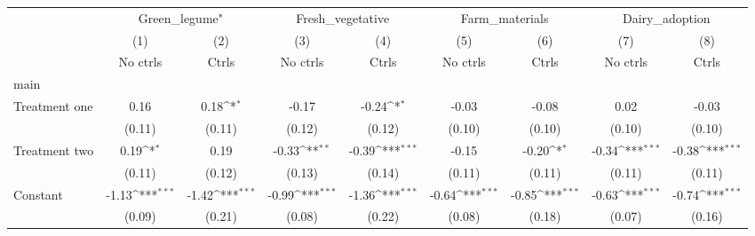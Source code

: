 {
\def\sym#1{\ifmmode^{#1}\else\(^{#1}\)\fi}
\begin{tabular}{l*{8}{c}}
\hline\hline
                    &\multicolumn{2}{c}{Green\_legume"}          &\multicolumn{2}{c}{Fresh\_vegetative}       &\multicolumn{2}{c}{Farm\_materials}         &\multicolumn{2}{c}{Dairy\_adoption}         \\
                    &\multicolumn{1}{c}{(1)}&\multicolumn{1}{c}{(2)}&\multicolumn{1}{c}{(3)}&\multicolumn{1}{c}{(4)}&\multicolumn{1}{c}{(5)}&\multicolumn{1}{c}{(6)}&\multicolumn{1}{c}{(7)}&\multicolumn{1}{c}{(8)}\\
                    &\multicolumn{1}{c}{No ctrls}&\multicolumn{1}{c}{Ctrls}&\multicolumn{1}{c}{No ctrls}&\multicolumn{1}{c}{Ctrls}&\multicolumn{1}{c}{No ctrls}&\multicolumn{1}{c}{Ctrls}&\multicolumn{1}{c}{No ctrls}&\multicolumn{1}{c}{Ctrls}\\
\hline
main                &                     &                     &                     &                     &                     &                     &                     &                     \\
Treatment one       &        0.16         &        0.18\sym{*}  &       -0.17         &       -0.24\sym{*}  &       -0.03         &       -0.08         &        0.02         &       -0.03         \\
                    &      (0.11)         &      (0.11)         &      (0.12)         &      (0.12)         &      (0.10)         &      (0.10)         &      (0.10)         &      (0.10)         \\
[1em]
Treatment two       &        0.19\sym{*}  &        0.19         &       -0.33\sym{**} &       -0.39\sym{***}&       -0.15         &       -0.20\sym{*}  &       -0.34\sym{***}&       -0.38\sym{***}\\
                    &      (0.11)         &      (0.12)         &      (0.13)         &      (0.14)         &      (0.11)         &      (0.11)         &      (0.11)         &      (0.11)         \\
[1em]
Constant            &       -1.13\sym{***}&       -1.42\sym{***}&       -0.99\sym{***}&       -1.36\sym{***}&       -0.64\sym{***}&       -0.85\sym{***}&       -0.63\sym{***}&       -0.74\sym{***}\\
                    &      (0.09)         &      (0.21)         &      (0.08)         &      (0.22)         &      (0.08)         &      (0.18)         &      (0.07)         &      (0.16)         \\
\hline

\end{tabular}}
